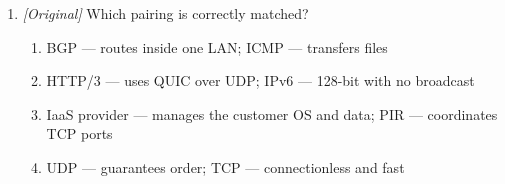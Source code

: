 \documentclass[11pt]{article}
\begin{document}
\begin{enumerate}[label=\textbf{Q\arabic*.}, leftmargin=*]
\begin{enumerate}[label=\Alph*.]
    \item I, II, and III
    \item I and II only
  \end{enumerate}
\item \textit{[Original]} Which pairing is correctly matched?
  \begin{enumerate}[label=\Alph*.]
    \item BGP --- routes inside one LAN; ICMP --- transfers files
    \item HTTP/3 --- uses QUIC over UDP; IPv6 --- 128-bit with no broadcast
    \item IaaS provider --- manages the customer OS and data; PIR ---
      coordinates TCP ports
    \item UDP --- guarantees order; TCP --- connectionless and fast
  \end{enumerate}


\end{enumerate}
\end{document}
